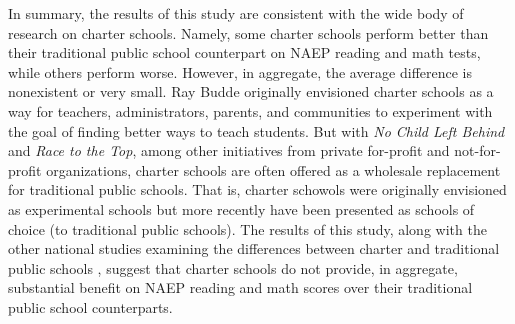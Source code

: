 \documentclass[letterpaper,12p,twoside]{article} %
\begin{document}
In summary, the results of this study are consistent with the wide body of research on charter schools. Namely, some charter schools perform better than their traditional public school counterpart on NAEP reading and math tests, while others perform worse. However, in aggregate, the average difference is nonexistent or very small. Ray Budde \citeyear{Budde1988} originally envisioned charter schools as a way for teachers, administrators, parents, and communities to experiment with the goal of finding better ways to teach students. But with \textit{No Child Left Behind} and \textit{Race to the Top}, among other initiatives from private for-profit and not-for-profit organizations, charter schools are often offered as a wholesale replacement for traditional public schools. That is, charter schowols were originally envisioned as experimental schools but more recently have been presented as schools of choice (to traditional public schools). The results of this study, along with the other national studies examining the differences between charter and traditional public schools \cite{credo,credo2013,BraunJenkinsGrigg2006}, suggest that charter schools do not provide, in aggregate, substantial benefit on NAEP reading and math scores over their traditional public school counterparts.





\end{document}
